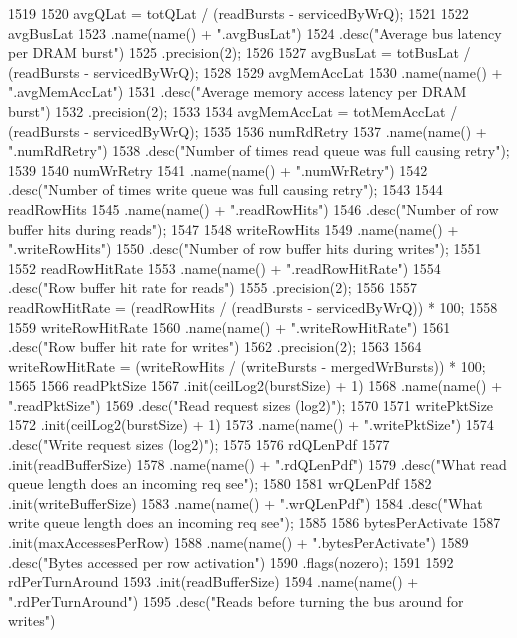\begin{DoxyCode}
{1519 
1520     avgQLat = totQLat / (readBursts - servicedByWrQ);
1521 
1522     avgBusLat
1523         .name(name() + ".avgBusLat")
1524         .desc("Average bus latency per DRAM burst")
1525         .precision(2);
1526 
1527     avgBusLat = totBusLat / (readBursts - servicedByWrQ);
1528 
1529     avgMemAccLat
1530         .name(name() + ".avgMemAccLat")
1531         .desc("Average memory access latency per DRAM burst")
1532         .precision(2);
1533 
1534     avgMemAccLat = totMemAccLat / (readBursts - servicedByWrQ);
1535 
1536     numRdRetry
1537         .name(name() + ".numRdRetry")
1538         .desc("Number of times read queue was full causing retry");
1539 
1540     numWrRetry
1541         .name(name() + ".numWrRetry")
1542         .desc("Number of times write queue was full causing retry");
1543 
1544     readRowHits
1545         .name(name() + ".readRowHits")
1546         .desc("Number of row buffer hits during reads");
1547 
1548     writeRowHits
1549         .name(name() + ".writeRowHits")
1550         .desc("Number of row buffer hits during writes");
1551 
1552     readRowHitRate
1553         .name(name() + ".readRowHitRate")
1554         .desc("Row buffer hit rate for reads")
1555         .precision(2);
1556 
1557     readRowHitRate = (readRowHits / (readBursts - servicedByWrQ)) * 100;
1558 
1559     writeRowHitRate
1560         .name(name() + ".writeRowHitRate")
1561         .desc("Row buffer hit rate for writes")
1562         .precision(2);
1563 
1564     writeRowHitRate = (writeRowHits / (writeBursts - mergedWrBursts)) * 100;
1565 
1566     readPktSize
1567         .init(ceilLog2(burstSize) + 1)
1568         .name(name() + ".readPktSize")
1569         .desc("Read request sizes (log2)");
1570 
1571      writePktSize
1572         .init(ceilLog2(burstSize) + 1)
1573         .name(name() + ".writePktSize")
1574         .desc("Write request sizes (log2)");
1575 
1576      rdQLenPdf
1577         .init(readBufferSize)
1578         .name(name() + ".rdQLenPdf")
1579         .desc("What read queue length does an incoming req see");
1580 
1581      wrQLenPdf
1582         .init(writeBufferSize)
1583         .name(name() + ".wrQLenPdf")
1584         .desc("What write queue length does an incoming req see");
1585 
1586      bytesPerActivate
1587          .init(maxAccessesPerRow)
1588          .name(name() + ".bytesPerActivate")
1589          .desc("Bytes accessed per row activation")
1590          .flags(nozero);
1591 
1592      rdPerTurnAround
1593          .init(readBufferSize)
1594          .name(name() + ".rdPerTurnAround")
1595          .desc("Reads before turning the bus around for writes")
}
\end{DoxyCode}
